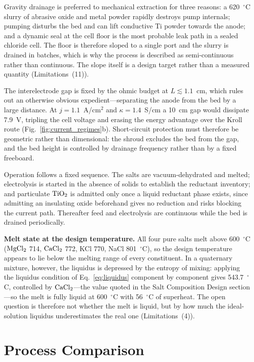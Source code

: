 \documentclass[11pt]{article}
\begin{document}
Gravity drainage is preferred to mechanical extraction for three reasons: a 620~$^{\circ}$C slurry of abrasive oxide and metal powder rapidly destroys pump internals; pumping disturbs the bed and can lift conductive Ti powder towards the anode; and a dynamic seal at the cell floor is the most probable leak path in a sealed chloride cell. The floor is therefore sloped to a single port and the slurry is drained in batches, which is why the process is described as semi-continuous rather than continuous. The slope itself is a design target rather than a measured quantity (Limitations~(11)).

The interelectrode gap is fixed by the ohmic budget at $L \lesssim 1.1$~cm, which rules out an otherwise obvious expedient---separating the anode from the bed by a large distance. At $j = 1.1$~A/cm$^2$ and $\kappa = 1.4$~S/cm a 10~cm gap would dissipate 7.9~V, tripling the cell voltage and erasing the energy advantage over the Kroll route (Fig.~\ref{fig:current_regimes}b). Short-circuit protection must therefore be geometric rather than dimensional: the shroud excludes the bed from the gap, and the bed height is controlled by drainage frequency rather than by a fixed freeboard.

Operation follows a fixed sequence. The salts are vacuum-dehydrated and melted; electrolysis is started in the absence of solids to establish the reductant inventory; and particulate $\ce{TiO2}$ is admitted only once a liquid reductant phase exists, since admitting an insulating oxide beforehand gives no reduction and risks blocking the current path. Thereafter feed and electrolysis are continuous while the bed is drained periodically.

\textbf{Melt state at the design temperature.} All four pure salts melt above 600~$^{\circ}$C ($\ce{MgCl2}$ 714, $\ce{CaCl2}$ 772, KCl 770, NaCl 801~$^{\circ}$C), so the design temperature appears to lie below the melting range of every constituent. In a quaternary mixture, however, the liquidus is depressed by the entropy of mixing: applying the liquidus condition of Eq.~\ref{eq:liquidus} component by component gives 543.7~$^{\circ}$C, controlled by $\ce{CaCl2}$---the value quoted in the Salt Composition Design section---so the melt is fully liquid at 600~$^{\circ}$C with 56~$^{\circ}$C of superheat. The open question is therefore not whether the melt is liquid, but by how much the ideal-solution liquidus underestimates the real one (Limitations~(4)).

\section*{Process Comparison}
\end{document}
